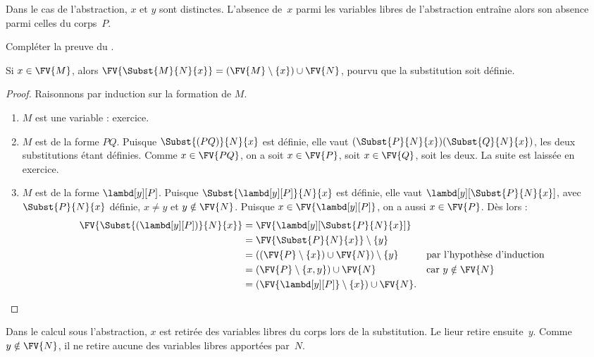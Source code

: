 \documentclass[../../../include/open-logic-section]{subfiles}
\begin{document}
\begin{explain}
Dans le cas de l'abstraction, $x$ et $y$ sont distinctes.
L'absence de~$x$ parmi les variables libres de l'abstraction
entraîne alors son absence parmi celles du corps~$P$.
\end{explain}

\begin{prob}
Compléter la preuve du
.
\end{prob}

\begin{thm} 
Si $x \in \FV{M}$, alors
$\FV{\Subst{M}{N}{x}} =
(\FV{M} \setminus \{x\}) \cup \FV{N}$,
pourvu que la substitution soit définie.
\end{thm}

\begin{proof}
Raisonnons par induction sur la formation de $M$.
\begin{enumerate}
\item $M$ est une variable : exercice.
\item $M$ est de la forme $PQ$. Puisque
  $\Subst{(PQ)}{N}{x}$ est définie, elle vaut
  $(\Subst{P}{N}{x})(\Subst{Q}{N}{x})$,
  les deux substitutions étant définies.
  Comme $x \in \FV{PQ}$, on a soit
  $x \in \FV{P}$, soit $x \in \FV{Q}$,
  soit les deux. La suite est laissée
  en exercice.
\item $M$ est de la forme $\lambd[y][P]$.
  Puisque $\Subst{\lambd[y][P]}{N}{x}$ est
  définie, elle vaut
  $\lambd[y][\Subst{P}{N}{x}]$,
  avec $\Subst{P}{N}{x}$ définie,
  $x \neq y$ et $y \notin \FV{N}$.
  Puisque $x \in \FV{\lambd[y][P]}$,
  on a aussi $x \in \FV{P}$. Dès lors :
  \begin{align*}
    \FV{\Subst{(\lambd[y][P])}{N}{x}}
    &= \FV{\lambd[y][\Subst{P}{N}{x}]}\\
    &= \FV{\Subst{P}{N}{x}} \setminus \{y\}\\
    &= ((\FV{P} \setminus \{x\}) \cup \FV{N})
       \setminus \{y\}
       && \text{par l'hypothèse d'induction}\\
    &= (\FV{P} \setminus \{x,y\}) \cup \FV{N}
       && \text{car }y \notin \FV{N}\\
    &= (\FV{\lambd[y][P]} \setminus \{x\})
       \cup \FV{N}.
  \end{align*}
\end{enumerate}
\end{proof}

\begin{explain}
Dans le calcul sous l'abstraction, $x$ est retirée des variables
libres du corps lors de la substitution. Le lieur retire
ensuite~$y$. Comme $y\notin\FV{N}$, il ne retire aucune des
variables libres apportées par~$N$.
\end{explain}
\end{document}
